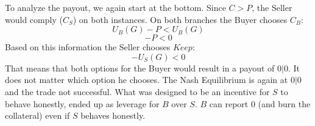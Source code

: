 \documentclass{cacthesis}
\begin{document}
To analyze the payout, we again start at the bottom. Since $C>P$, the Seller would comply ($C_S$) on both instances.\newline
On both branches the Buyer chooses $C_B$: \[U_B(G)-P < U_B(G)\] \[-P < 0\]
Based on this information the Seller chooses $Keep$: \[-U_S(G) < 0\]
That means that both options for the Buyer would result in a payout of $0|0$. It does not matter which option he chooses.\newline
The Nash Equilibrium is again at $0|0$ and the trade not successful.\newline
What was designed to be an incentive for $S$ to behave honestly, ended up as leverage for $B$ over $S$. $B$ can report 0 (and burn the collateral) even if $S$ behaves honestly. 
\end{document}
